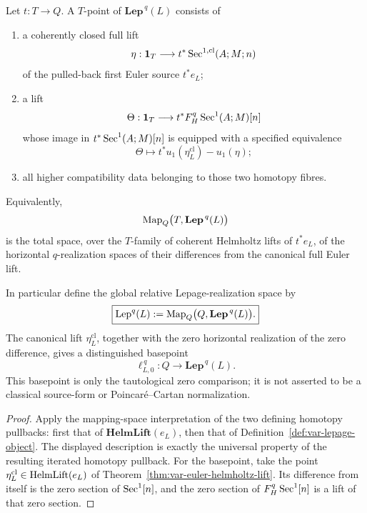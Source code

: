 \begin{proposition}
\label{prop:var-lepage-representing}
Let \(t:T\to Q\).  A \(T\)-point of \(\mathbf{Lep}^{\,q}(L)\) consists of
\begin{enumerate}
\item a coherently closed full lift
\[
    \eta:
    \mathbf 1_T\longrightarrow
    t^*\operatorname{Sec}^{1,\mathrm{cl}}(A;M;n)
\]
of the pulled-back first Euler source \(t^*e_L\);
\item a lift
\[
    \Theta:
    \mathbf 1_T\longrightarrow
    t^*F_H^q\operatorname{Sec}^1(A;M)[n]
\]
whose image in \(t^*\operatorname{Sec}^1(A;M)[n]\) is equipped with a specified equivalence
\[
    \Theta\longmapsto
    t^*u_1(\eta_L^{\mathrm{cl}})-u_1(\eta);
\]
\item all higher compatibility data belonging to those two homotopy fibres.
\end{enumerate}
Equivalently,
\[
    \operatorname{Map}_Q\bigl(T,\mathbf{Lep}^{\,q}(L)\bigr)
\]
is the total space, over the \(T\)-family of coherent Helmholtz lifts of \(t^*e_L\), of the horizontal \(q\)-realization spaces of their differences from the canonical full Euler lift.

In particular define the global relative Lepage-realization space by
\[
    \boxed{
    \operatorname{Lep}^q(L)
    :=
    \operatorname{Map}_Q\bigl(Q,\mathbf{Lep}^{\,q}(L)\bigr).
    }
\]
The canonical lift \(\eta_L^{\mathrm{cl}}\), together with the zero horizontal realization of the zero difference, gives a distinguished basepoint
\[
    \ell_{L,0}^{\,q}:Q\longrightarrow\mathbf{Lep}^{\,q}(L).
\]
This basepoint is only the tautological zero comparison; it is not asserted to be a classical source-form or Poincar\'e--Cartan normalization.
\end{proposition}

\begin{proof}
Apply the mapping-space interpretation of the two defining homotopy pullbacks: first that of \(\mathbf{HelmLift}(e_L)\), then that of Definition~\ref{def:var-lepage-object}.  The displayed description is exactly the universal property of the resulting iterated homotopy pullback.  For the basepoint, take the point \(\eta_L^{\mathrm{cl}}\in\operatorname{HelmLift}(e_L)\) of Theorem~\ref{thm:var-euler-helmholtz-lift}.  Its difference from itself is the zero section of \(\operatorname{Sec}^1[n]\), and the zero section of \(F_H^q\operatorname{Sec}^1[n]\) is a lift of that zero section.
\end{proof}


